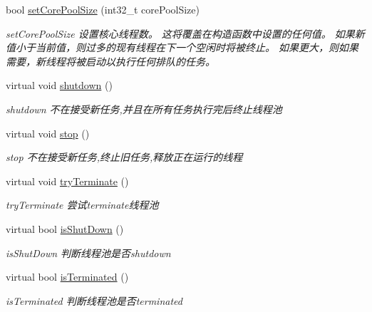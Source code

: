 \begin{DoxyCompactItemize}
bool \hyperlink{classThreadPoolExecutor_aaada9deadf7c0f72bca5076deaa8c92f}{set\+Core\+Pool\+Size} (int32\+\_\+t core\+Pool\+Size)
\begin{DoxyCompactList}\small\item\em set\+Core\+Pool\+Size 设置核心线程数。 这将覆盖在构造函数中设置的任何值。 如果新值小于当前值，则过多的现有线程在下一个空闲时将被终止。 如果更大，则如果需要，新线程将被启动以执行任何排队的任务。 \end{DoxyCompactList}\item 
\mbox{\label{classThreadPoolExecutor_a1963a058c29d90e1f7cdb755b83fdff0}} 
virtual void \hyperlink{classThreadPoolExecutor_a1963a058c29d90e1f7cdb755b83fdff0}{shutdown} ()
\begin{DoxyCompactList}\small\item\em shutdown 不在接受新任务,并且在所有任务执行完后终止线程池 \end{DoxyCompactList}\item 
\mbox{\label{classThreadPoolExecutor_aaea5ac0ff50c7e198cb3f2a542a706c9}} 
virtual void \hyperlink{classThreadPoolExecutor_aaea5ac0ff50c7e198cb3f2a542a706c9}{stop} ()
\begin{DoxyCompactList}\small\item\em stop 不在接受新任务,终止旧任务,释放正在运行的线程 \end{DoxyCompactList}\item 
\mbox{\label{classThreadPoolExecutor_a6b09fafdffb979e7b422d67cb1958c20}} 
virtual void \hyperlink{classThreadPoolExecutor_a6b09fafdffb979e7b422d67cb1958c20}{try\+Terminate} ()
\begin{DoxyCompactList}\small\item\em try\+Terminate 尝试terminate线程池 \end{DoxyCompactList}\item 
virtual bool \hyperlink{classThreadPoolExecutor_a37702302c7a946b998ce92048ce68e2f}{is\+Shut\+Down} ()
\begin{DoxyCompactList}\small\item\em is\+Shut\+Down 判断线程池是否shutdown \end{DoxyCompactList}\item 
virtual bool \hyperlink{classThreadPoolExecutor_a7febfdf06752de6e4114f1de3ae9b135}{is\+Terminated} ()
\begin{DoxyCompactList}\small\item\em is\+Terminated 判断线程池是否terminated \end{DoxyCompactList}\end{DoxyCompactItemize}
